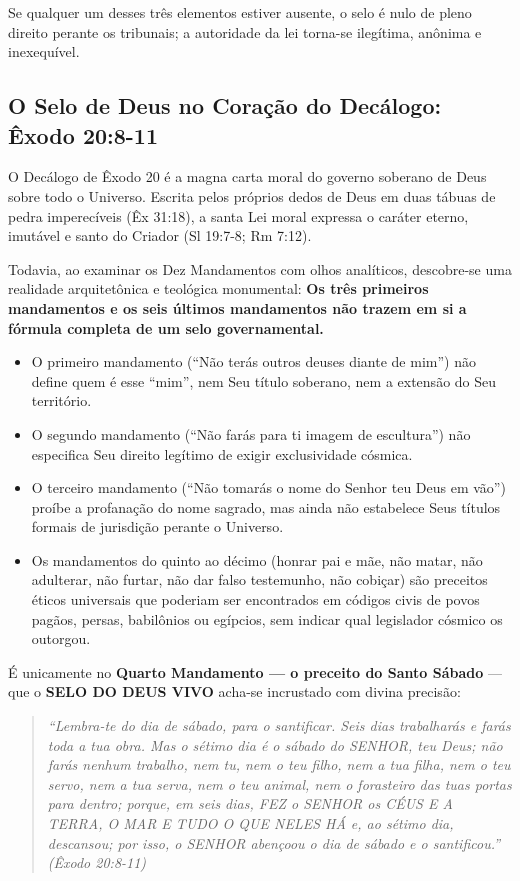 Se qualquer um desses três elementos estiver ausente, o selo é nulo de pleno direito perante os tribunais; a autoridade da lei torna-se ilegítima, anônima e inexequível.



\subsection{O Selo de Deus no Coração do Decálogo: Êxodo 20:8-11}


O Decálogo de Êxodo 20 é a magna carta moral do governo soberano de Deus sobre todo o Universo. Escrita pelos próprios dedos de Deus em duas tábuas de pedra imperecíveis (Êx 31:18), a santa Lei moral expressa o caráter eterno, imutável e santo do Criador (Sl 19:7-8; Rm 7:12).

Todavia, ao examinar os Dez Mandamentos com olhos analíticos, descobre-se uma realidade arquitetônica e teológica monumental: \textbf{Os três primeiros mandamentos e os seis últimos mandamentos não trazem em si a fórmula completa de um selo governamental.}

\begin{itemize}
  \item O primeiro mandamento (``Não terás outros deuses diante de mim'') não define quem é esse ``mim'', nem Seu título soberano, nem a extensão do Seu território.
  \item O segundo mandamento (``Não farás para ti imagem de escultura'') não especifica Seu direito legítimo de exigir exclusividade cósmica.
  \item O terceiro mandamento (``Não tomarás o nome do Senhor teu Deus em vão'') proíbe a profanação do nome sagrado, mas ainda não estabelece Seus títulos formais de jurisdição perante o Universo.
  \item Os mandamentos do quinto ao décimo (honrar pai e mãe, não matar, não adulterar, não furtar, não dar falso testemunho, não cobiçar) são preceitos éticos universais que poderiam ser encontrados em códigos civis de povos pagãos, persas, babilônios ou egípcios, sem indicar qual legislador cósmico os outorgou.
\end{itemize}


É unicamente no \textbf{Quarto Mandamento — o preceito do Santo Sábado} — que o \textbf{SELO DO DEUS VIVO} acha-se incrustado com divina precisão:


\begin{quote}
\itshape \textit{``Lembra-te do dia de sábado, para o santificar. Seis dias trabalharás e farás toda a tua obra. Mas o sétimo dia é o sábado do SENHOR, teu Deus; não farás nenhum trabalho, nem tu, nem o teu filho, nem a tua filha, nem o teu servo, nem a tua serva, nem o teu animal, nem o forasteiro das tuas portas para dentro; porque, em seis dias, FEZ o SENHOR os CÉUS E A TERRA, O MAR E TUDO O QUE NELES HÁ e, ao sétimo dia, descansou; por isso, o SENHOR abençoou o dia de sábado e o santificou.''} (Êxodo 20:8-11)
\end{quote}


